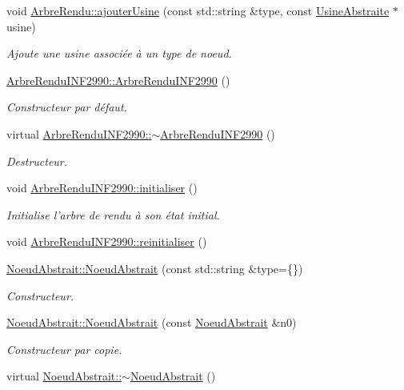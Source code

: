 \begin{DoxyCompactItemize}
void \hyperlink{group__inf2990_ga296a744837fb7b779fadf2e8c62e6577}{Arbre\-Rendu\-::ajouter\-Usine} (const std\-::string \&type, const \hyperlink{class_usine_abstraite}{Usine\-Abstraite} $\ast$usine)
\begin{DoxyCompactList}\small\item\em Ajoute une usine associée à un type de noeud. \end{DoxyCompactList}\item 
\hyperlink{group__inf2990_ga67528b7fa54e8ef8f96ef2e0bad06d2d}{Arbre\-Rendu\-I\-N\-F2990\-::\-Arbre\-Rendu\-I\-N\-F2990} ()
\begin{DoxyCompactList}\small\item\em Constructeur par défaut. \end{DoxyCompactList}\item 
virtual \hyperlink{group__inf2990_gaa67526b2fd719f6bcef7a4547bd25c7b}{Arbre\-Rendu\-I\-N\-F2990\-::$\sim$\-Arbre\-Rendu\-I\-N\-F2990} ()
\begin{DoxyCompactList}\small\item\em Destructeur. \end{DoxyCompactList}\item 
void \hyperlink{group__inf2990_ga678d89e1f12ae16ee7dcf6de3db637a3}{Arbre\-Rendu\-I\-N\-F2990\-::initialiser} ()
\begin{DoxyCompactList}\small\item\em Initialise l'arbre de rendu à son état initial. \end{DoxyCompactList}\item 
void \hyperlink{group__inf2990_ga89a0f10b03fe16d6ddc0e8c23ae69e76}{Arbre\-Rendu\-I\-N\-F2990\-::reinitialiser} ()
\item 
\hyperlink{group__inf2990_gad1eae42fe2bccef56f55b8a52726657f}{Noeud\-Abstrait\-::\-Noeud\-Abstrait} (const std\-::string \&type=\{\})
\begin{DoxyCompactList}\small\item\em Constructeur. \end{DoxyCompactList}\item 
\hyperlink{group__inf2990_gae7bea8d23c4dad60c334fc6806d08d01}{Noeud\-Abstrait\-::\-Noeud\-Abstrait} (const \hyperlink{class_noeud_abstrait}{Noeud\-Abstrait} \&n0)
\begin{DoxyCompactList}\small\item\em Constructeur par copie. \end{DoxyCompactList}\item 
virtual \hyperlink{group__inf2990_ga0ab3f7ab838e8349113da5074abcdc3a}{Noeud\-Abstrait\-::$\sim$\-Noeud\-Abstrait} ()

\end{DoxyCompactItemize}
